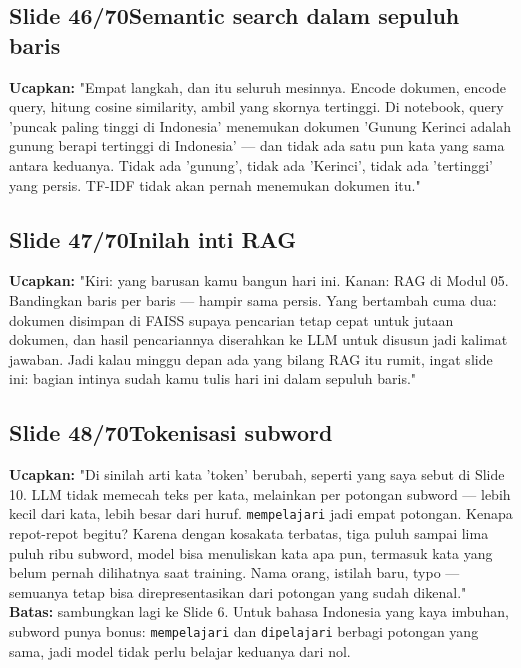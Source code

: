 \documentclass[11pt]{article}
\renewcommand{\framebox}[1]{\colorbox{acc!15}{\textcolor{acc}{\textbf{#1}}}}
\begin{document}
\subsection*{\framebox{Slide 46/70}\quad Semantic search dalam sepuluh baris}
\textbf{Ucapkan:} "Empat langkah, dan itu seluruh mesinnya. Encode dokumen, encode query, hitung cosine similarity, ambil yang skornya tertinggi. Di notebook, query 'puncak paling tinggi di Indonesia' menemukan dokumen 'Gunung Kerinci adalah gunung berapi tertinggi di Indonesia' — dan tidak ada satu pun kata yang sama antara keduanya. Tidak ada 'gunung', tidak ada 'Kerinci', tidak ada 'tertinggi' yang persis. TF-IDF tidak akan pernah menemukan dokumen itu."\\[2pt]

\subsection*{\framebox{Slide 47/70}\quad Inilah inti RAG}
\textbf{Ucapkan:} "Kiri: yang barusan kamu bangun hari ini. Kanan: RAG di Modul 05. Bandingkan baris per baris — hampir sama persis. Yang bertambah cuma dua: dokumen disimpan di FAISS supaya pencarian tetap cepat untuk jutaan dokumen, dan hasil pencariannya diserahkan ke LLM untuk disusun jadi kalimat jawaban. Jadi kalau minggu depan ada yang bilang RAG itu rumit, ingat slide ini: bagian intinya sudah kamu tulis hari ini dalam sepuluh baris."\\[2pt]

\subsection*{\framebox{Slide 48/70}\quad Tokenisasi subword}
\textbf{Ucapkan:} "Di sinilah arti kata 'token' berubah, seperti yang saya sebut di Slide 10. LLM tidak memecah teks per kata, melainkan per potongan subword — lebih kecil dari kata, lebih besar dari huruf. \texttt{mempelajari} jadi empat potongan. Kenapa repot-repot begitu? Karena dengan kosakata terbatas, tiga puluh sampai lima puluh ribu subword, model bisa menuliskan kata apa pun, termasuk kata yang belum pernah dilihatnya saat training. Nama orang, istilah baru, typo — semuanya tetap bisa direpresentasikan dari potongan yang sudah dikenal."\\[2pt]
\textbf{Batas:} sambungkan lagi ke Slide 6. Untuk bahasa Indonesia yang kaya imbuhan, subword punya bonus: \texttt{mempelajari} dan \texttt{dipelajari} berbagi potongan yang sama, jadi model tidak perlu belajar keduanya dari nol.\\[2pt]
\end{document}
